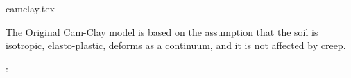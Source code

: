 \begin{flushright} {\tiny {\color{gray} camclay.tex}} \end{flushright}

The Original Cam-Clay model is based on the assumption that the soil 
is isotropic, elasto-plastic, deforms as a continuum, and it is not affected by creep.

\Literature: \cite{pehu03}

